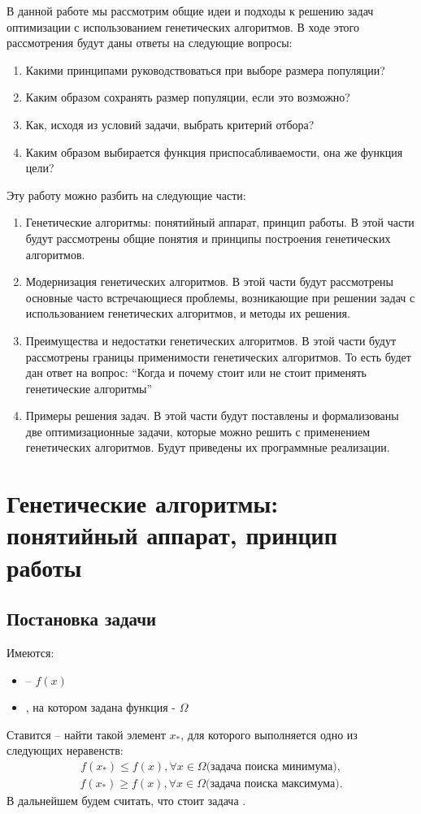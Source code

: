 В данной работе мы рассмотрим общие идеи и подходы к решению задач оптимизации с использованием генетических алгоритмов. В ходе этого рассмотрения будут даны ответы на следующие вопросы:
\begin{enumerate}
\item Какими принципами руководствоваться при выборе размера популяции?
\item Каким образом сохранять размер популяции, если это возможно?
\item Как, исходя из условий задачи, выбрать критерий отбора?
\item Каким образом выбирается функция приспосабливаемости, она же функция цели?
\end{enumerate}
Эту работу можно разбить на следующие части:
\begin{enumerate}
\item Генетические алгоритмы: понятийный аппарат, принцип работы. В этой части будут рассмотрены общие понятия и принципы построения генетических алгоритмов.
\item Модернизация генетических алгоритмов. В этой части будут рассмотрены основные часто встречающиеся проблемы, возникающие при решении задач с использованием генетических алгоритмов, и методы их решения.
\item Преимущества и недостатки генетических алгоритмов. В этой части будут рассмотрены границы применимости генетических алгоритмов. То есть будет дан ответ на вопрос: ``Когда и почему стоит или не стоит применять генетические алгоритмы''
\item Примеры решения задач. В этой части будут поставлены и формализованы две оптимизационные задачи, которые можно решить с применением генетических алгоритмов. Будут приведены их программные реализации.
\end{enumerate}
\chapter{Генетические алгоритмы: понятийный аппарат, принцип работы}
\section{Постановка задачи}
Имеются:
\begin{itemize}
\item {} --  $f(x)$
\item {}, на котором задана функция - $\Omega$
\end{itemize}
Ставится  -- найти такой элемент $x_{\ast}$, для которого выполняется одно из следующих неравенств:
\begin{eqnarray*}
f(x_{\ast}) \leq f(x), \forall x \in \Omega  \textrm{(задача поиска минимума)},
\end{eqnarray*}
\begin{eqnarray*}
f(x_{\ast}) \geq f(x), \forall x \in \Omega  \textrm{(задача поиска максимума)}.
\end{eqnarray*}
В дальнейшем будем считать, что стоит задача .

